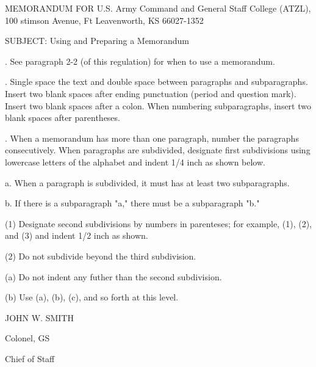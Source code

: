 \documentclass[12pt,letterpaper,oneside]{report}
\begin{document}
\begin{raggedright}
\setlength{\parskip}{24pt}
\noindent
MEMORANDUM FOR U.S. Army Command and General Staff College (ATZL), 100 stimson Avenue, Ft Leavenworth, KS 66027-1352

\setlength{\parskip}{12pt}
\noindent
SUBJECT: Using and Preparing a Memorandum

\setlength{\parskip}{24pt}
.\hphantom{.} See paragraph 2-2 (of this regulation) for when to use a memorandum.

\setlength{\parskip}{12pt}
.\hphantom{.} Single space the text and double space between paragraphs and subparagraphs. Insert two blank spaces after ending punctuation (period and question mark). Insert two blank spaces after a colon. When numbering subparagraphs, insert two blank spaces after parentheses.

\setlength{\parskip}{12pt}
.\hphantom{.} When a memorandum has more than one paragraph, number the paragraphs consecutively. When paragraphs are subdivided, designate first subdivisions using lowercase letters of the alphabet and indent 1/4 inch as shown below.

\setlength{\parskip}{12pt}
\setlength\parindent{0.25in}
a.\hphantom{x} When a paragraph is subdivided, it must has at least two subparagraphs.

\setlength{\parskip}{12pt}
\setlength\parindent{0.25in}
b.\hphantom{x} If there is a subparagraph "a," there must be a subparagraph "b."

\setlength{\parskip}{12pt}
\setlength\parindent{0.5in}
(1)\hphantom{x} Designate second subdivisions by numbers in parenteses; for example, (1), (2), and (3) and indent 1/2 inch as shown.

\setlength{\parskip}{12pt}
\setlength\parindent{0.5in}
(2)\hphantom{x} Do not subdivide beyond the third subdivision.

\setlength{\parskip}{12pt}
\setlength\parindent{0.5in}
(a)\hphantom{x} Do not indent any futher than the second subdivision.

\setlength{\parskip}{12pt}
\setlength\parindent{0.5in}
(b)\hphantom{x} Use (a), (b), (c), and so forth at this level.

\setlength{\parskip}{48pt}
\setlength\parindent{3.25in}
JOHN W. SMITH

\setlength{\parskip}{0pt}
\setlength\parindent{3.25in}
Colonel, GS

\setlength{\parskip}{0pt}
\setlength\parindent{3.25in}
Chief of Staff

\end{raggedright}
\end{document}
